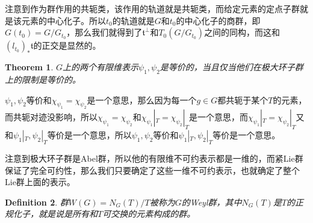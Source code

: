 \documentclass[9pt]{extbook}
\theoremstyle{plain}
\newtheorem{defi}{Definition}
\newtheorem{theo}[defi]{Theorem}
\begin{document}
注意到作为群作用的共轭类，该作用的轨道就是共轭类，而给定元素的定点子群就是该元素的中心化子。所以$t_0$的轨道就是$G$和$t_0$的中心化子的商群，即$G(t_0)=G/G_{t_0}$，那么我们就得到了$\mathfrak{t}^\bot$和$T_0(G/G_{t_0})$之间的同构，而这和$(l_{t_0})_*\mathfrak{t}$的正交是显然的。
\begin{theo}
$G$上的两个有限维表示$\psi_1,\psi_2$是等价的，当且仅当他们在极大环子群上的限制是等价的。
\end{theo}
$\psi_1,\psi_2$等价和$\chi_{\psi_1}=\chi_{\psi_2}$是一个意思，那么因为每一个$g\in G$都共轭于某个$T$的元素，而共轭对迹没影响，所以$\chi_{\psi_1}=\chi_{\psi_2}$和$\chi_{\psi_1}|_T=\chi_{\psi_2}|_T$是一个意思，而$\chi_{\psi_1}|_T=\chi_{\psi_2}|_T$又和$\psi_1|_T,\psi_2|_T$等价是一个意思，所以$\psi_1,\psi_2$等价和$\psi_1|_T,\psi_2|_T$等价是一个意思。

注意到极大环子群是Abel群，所以他的有限维不可约表示都是一维的，而紧Lie群保证了完全可约性，那么我们只要确定了这些一维不可约表示，也就确定了整个Lie群上面的表示。
\begin{defi}
群$W(G)=N_G(T)/T$被称为$G$的Weyl群，其中$N_G(T)$是$T$的正规化子，就是说是所有和$T$可交换的元素构成的群。
\end{defi}
\end{document}

